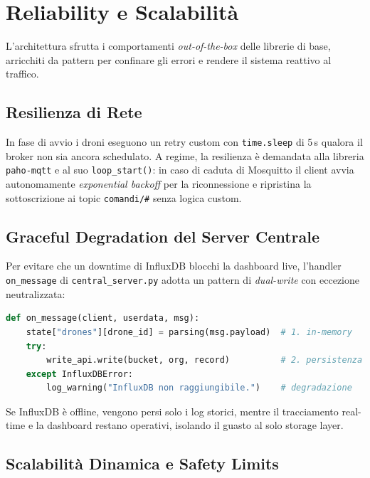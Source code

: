 
\chapter{Reliability e Scalabilità}
\label{cap:reliability_scalability}

L'architettura sfrutta i comportamenti \emph{out-of-the-box} delle librerie di base, arricchiti da pattern per confinare gli errori e rendere il sistema reattivo al traffico.

\section{Resilienza di Rete}
\label{sec:resilienza_rete}

In fase di avvio i droni eseguono un retry custom con \texttt{time.sleep} di 5\,s qualora il broker non sia ancora schedulato. A regime, la resilienza è demandata alla libreria \texttt{paho-mqtt} e al suo \texttt{loop\_start()}: in caso di caduta di Mosquitto il client avvia autonomamente \textit{exponential backoff} per la riconnessione e ripristina la sottoscrizione ai topic \texttt{comandi/\#} senza logica custom.

\section{Graceful Degradation del Server Centrale}
\label{sec:graceful_degradation}

Per evitare che un downtime di InfluxDB blocchi la dashboard live, l'handler \texttt{on\_message} di \texttt{central\_server.py} adotta un pattern di \textit{dual-write} con eccezione neutralizzata:

\begin{lstlisting}[language=Python, caption={Pattern di Graceful Degradation.}, label={lst:graceful_degradation}]
def on_message(client, userdata, msg):
    state["drones"][drone_id] = parsing(msg.payload)  # 1. in-memory
    try:
        write_api.write(bucket, org, record)          # 2. persistenza
    except InfluxDBError:
        log_warning("InfluxDB non raggiungibile.")    # degradazione
\end{lstlisting}

Se InfluxDB è offline, vengono persi solo i log storici, mentre il tracciamento real-time e la dashboard restano operativi, isolando il guasto al solo storage layer.

\section{Scalabilità Dinamica e Safety Limits}
\label{sec:scalabilita_dinamica}

